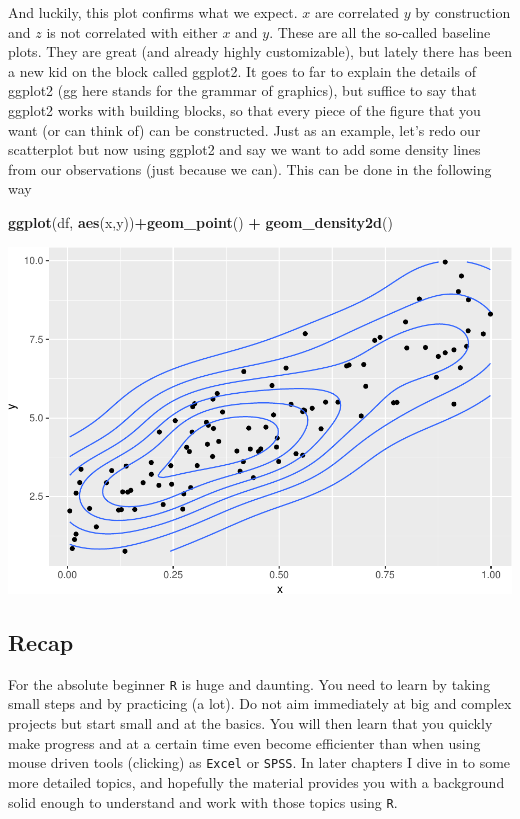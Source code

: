 \documentclass[]{article}
\newenvironment{Shaded}{\begin{snugshade}}{\end{snugshade}}
\newcommand{\KeywordTok}[1]{\textcolor[rgb]{0.13,0.29,0.53}{\textbf{#1}}}
\newcommand{\StringTok}[1]{\textcolor[rgb]{0.31,0.60,0.02}{#1}}
\newcommand{\OperatorTok}[1]{\textcolor[rgb]{0.81,0.36,0.00}{\textbf{#1}}}
\newcommand{\NormalTok}[1]{#1}
\theoremstyle{definition}
\theoremstyle{definition}
\theoremstyle{definition}
\theoremstyle{remark}
\begin{document}
And luckily, this plot confirms what we expect. \(x\) are correlated
\(y\) by construction and \(z\) is not correlated with either \(x\) and
\(y\). These are all the so-called baseline plots. They are great (and
already highly customizable), but lately there has been a new kid on the
block called ggplot2. It goes to far to explain the details of ggplot2
(gg here stands for the grammar of graphics), but suffice to say that
ggplot2 works with building blocks, so that every piece of the figure
that you want (or can think of) can be constructed. Just as an example,
let's redo our scatterplot but now using ggplot2 and say we want to add
some density lines from our observations (just because we can). This can
be done in the following way

\begin{Shaded}
\begin{Highlighting}[]
\KeywordTok{ggplot}\NormalTok{(df, }\KeywordTok{aes}\NormalTok{(x,y))}\OperatorTok{+}\KeywordTok{geom_point}\NormalTok{() }\OperatorTok{+}\StringTok{ }\KeywordTok{geom_density2d}\NormalTok{()}
\end{Highlighting}
\end{Shaded}

\includegraphics{./unnamed-chunk-30-1.pdf}

\subsection{Recap}\label{recap}

For the absolute beginner \texttt{R} is huge and daunting. You need to
learn by taking small steps and by practicing (a lot). Do not aim
immediately at big and complex projects but start small and at the
basics. You will then learn that you quickly make progress and at a
certain time even become efficienter than when using mouse driven tools
(clicking) as \texttt{Excel} or \texttt{SPSS}. In later chapters I dive
in to some more detailed topics, and hopefully the material provides you
with a background solid enough to understand and work with those topics
using \texttt{R}.
\end{document}
